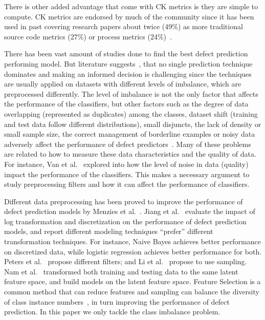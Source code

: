 \documentclass[sigconf,review, anonymous]{acmart}
\theoremstyle{break}
\theoremstyle{break}
\begin{document}
There is other added advantage that come with CK metrics is they are  simple  to  compute. CK metrics are endorsed by much of the community since it has been used in past covering research papers about twice (49\%) 
as more traditional source code metrics (27\%) or process metrics (24\%)~\cite{radjenovic2013software}. 

There has been vast amount of studies done to find the best defect prediction performing model. But literature suggests~\cite{lessmann2008benchmarking, ghotra2015revisiting}, that no single prediction technique dominates and making an informed decision is challenging since the techniques are usually applied on datasets with different levels of imbalance, which are preprocessed differently. 
The level of imbalance is not the only factor that affects
the performance of the classifiers, but other factors
such as the degree of data overlapping (represented
as duplicates) among the classes, dataset shift (training and test
data follow different distributions), small disjuncts, the lack of density
or small sample size, the
correct management of borderline examples or noisy
data adversely affect the performance of defect predictors~\cite{lopez2014importance,lopez2012analysis}. Many of these problems are related to how to
measure these data characteristics and the quality of
data. For instance, Van et al.~\cite{van2009knowledge}
explored into how the level of noise in data (quality) impact the performance of the classifiers. This makes a necessary argument to study preprocessing filters and how it can affect the performance of classifiers. 

Different data preprocessing has been proved
to improve the performance of defect prediction models by
Menzies et al.~\cite{menzies2007data}. Jiang et al.~\cite{jiang2008can} evaluate the impact of
log transformation and discretization on the performance
of defect prediction models, and report different modeling
techniques ``prefer'' different transformation techniques. For
instance, Naive Bayes achieves better performance on discretized
data, while logistic regression achieves better performance
for both. Peters et al.~\cite{peters2013better} propose different filters; and Li et al.~\cite{li2012sample} propose
to use sampling. Nam et al.~\cite{nam2013transfer} transformed both
training and testing data to the same latent feature space,
and build models on the latent feature space. 
Feature Selection is a common method that can
reduce features and sampling can balance the diversity of
class instance numbers~\cite{yin2015empirical}, in turn improving the performance of defect prediction. In this paper we only tackle the class imbalance problem.
\end{document}
